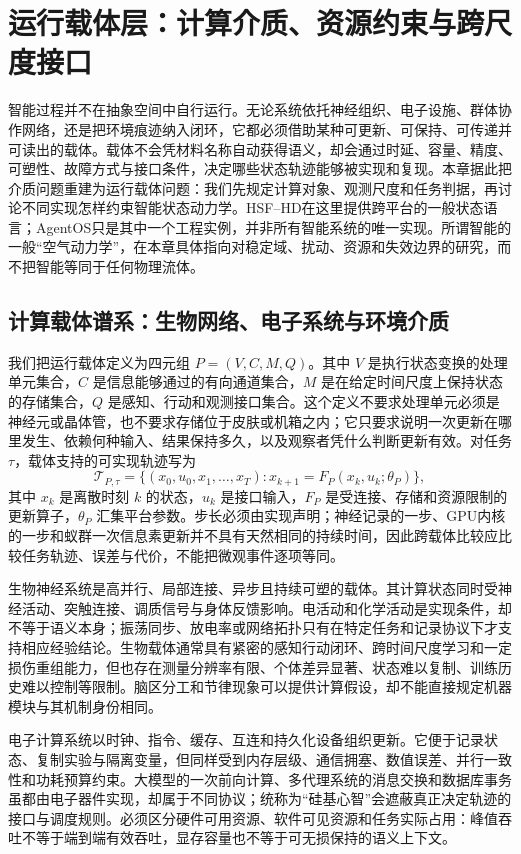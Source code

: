 \chapter{运行载体层：计算介质、资源约束与跨尺度接口}
\label{chp:medium_layer_ch}

智能过程并不在抽象空间中自行运行。无论系统依托神经组织、电子设施、群体协作网络，还是把环境痕迹纳入闭环，它都必须借助某种可更新、可保持、可传递并可读出的载体。载体不会凭材料名称自动获得语义，却会通过时延、容量、精度、可塑性、故障方式与接口条件，决定哪些状态轨迹能够被实现和复现。本章据此把介质问题重建为运行载体问题：我们先规定计算对象、观测尺度和任务判据，再讨论不同实现怎样约束智能状态动力学。HSF--HD在这里提供跨平台的一般状态语言；AgentOS只是其中一个工程实例，并非所有智能系统的唯一实现。所谓智能的一般“空气动力学”，在本章具体指向对稳定域、扰动、资源和失效边界的研究，而不把智能等同于任何物理流体。

\section{计算载体谱系：生物网络、电子系统与环境介质}
\label{sec:physical_substrate_spectrum}

我们把运行载体定义为四元组 $P=(V,C,M,Q)$。其中 $V$ 是执行状态变换的处理单元集合，$C$ 是信息能够通过的有向通道集合，$M$ 是在给定时间尺度上保持状态的存储集合，$Q$ 是感知、行动和观测接口集合。这个定义不要求处理单元必须是神经元或晶体管，也不要求存储位于皮肤或机箱之内；它只要求说明一次更新在哪里发生、依赖何种输入、结果保持多久，以及观察者凭什么判断更新有效。对任务 $\tau$，载体支持的可实现轨迹写为
\[
\mathcal T_{P,\tau}=\{(x_0,u_0,x_1,\ldots,x_T):x_{k+1}=F_P(x_k,u_k;\theta_P)\},
\]
其中 $x_k$ 是离散时刻 $k$ 的状态，$u_k$ 是接口输入，$F_P$ 是受连接、存储和资源限制的更新算子，$\theta_P$ 汇集平台参数。步长必须由实现声明；神经记录的一步、GPU内核的一步和蚁群一次信息素更新并不具有天然相同的持续时间，因此跨载体比较应比较任务轨迹、误差与代价，不能把微观事件逐项等同。

生物神经系统是高并行、局部连接、异步且持续可塑的载体。其计算状态同时受神经活动、突触连接、调质信号与身体反馈影响。电活动和化学活动是实现条件，却不等于语义本身；振荡同步、放电率或网络拓扑只有在特定任务和记录协议下才支持相应经验结论。生物载体通常具有紧密的感知行动闭环、跨时间尺度学习和一定损伤重组能力，但也存在测量分辨率有限、个体差异显著、状态难以复制、训练历史难以控制等限制。脑区分工和节律现象可以提供计算假设，却不能直接规定机器模块与其机制身份相同。

电子计算系统以时钟、指令、缓存、互连和持久化设备组织更新。它便于记录状态、复制实验与隔离变量，但同样受到内存层级、通信拥塞、数值误差、并行一致性和功耗预算约束。大模型的一次前向计算、多代理系统的消息交换和数据库事务虽都由电子器件实现，却属于不同协议；统称为“硅基心智”会遮蔽真正决定轨迹的接口与调度规则。必须区分硬件可用资源、软件可见资源和任务实际占用：峰值吞吐不等于端到端有效吞吐，显存容量也不等于可无损保持的语义上下文。

